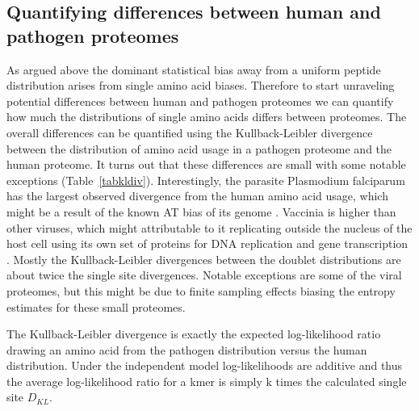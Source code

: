 \documentclass[superscriptaddress,twocolumn,pre]{revtex4}
\newcommand{\<}{\langle}
\renewcommand{\>}{\rangle}
\begin{document}
\subsection{Quantifying differences between human and pathogen proteomes}

As argued above the dominant statistical bias away from a uniform peptide distribution arises from single amino acid biases. Therefore to start unraveling potential differences between human and pathogen proteomes we can quantify how much the distributions of single amino acids differs between proteomes. The overall differences can be quantified using the Kullback-Leibler divergence between the distribution of amino acid usage in a pathogen proteome and the human proteome. It turns out that these differences are small with some notable exceptions (Table~\ref{tabkldiv}). Interestingly, the parasite Plasmodium falciparum has the largest observed divergence from the human amino acid usage, which might be a result of the known AT bias of its genome \cite{Hamilton2017}. Vaccinia is higher than other viruses, which might attributable to it replicating outside the nucleus of the host cell using its own set of proteins for DNA replication and gene transcription \cite{Tolonen2001}. Mostly the Kullback-Leibler divergences between the doublet distributions are about twice the single site divergences. Notable exceptions are some of the viral proteomes, but this might be due to finite sampling effects biasing the entropy estimates for these small proteomes.

The Kullback-Leibler divergence is exactly the expected log-likelihood ratio drawing an amino acid from the pathogen distribution versus the human distribution. Under the independent model log-likelihoods are additive and thus the average log-likelihood ratio for a kmer is simply k times the calculated single site $D_{KL}$.
\end{document}
